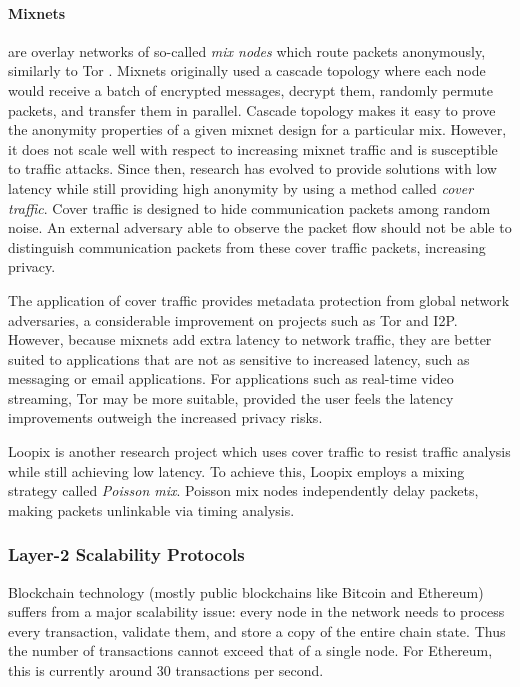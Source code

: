 \paragraph{Mixnets} are overlay networks of so-called \textit{mix nodes} which route packets anonymously, similarly to Tor \cite{mixnets}. Mixnets originally used a cascade topology where each node would receive a batch of encrypted messages, decrypt them, randomly permute packets, and transfer them in parallel. Cascade topology makes it easy to prove the anonymity properties of a given mixnet design for a particular mix. However, it does not scale well with respect to increasing mixnet traffic and is susceptible to traffic attacks. Since then, research has evolved to provide solutions with low latency while still providing high anonymity by using a method called \textit{cover traffic}. Cover traffic is designed to hide communication packets among random noise. An external adversary able to observe the packet flow should not be able to distinguish communication packets from these cover traffic packets, increasing privacy.

The application of cover traffic provides metadata protection from global network adversaries, a considerable improvement on projects such as Tor and I2P. However, because mixnets add extra latency to network traffic, they are better suited to applications that are not as sensitive to increased latency, such as messaging or email applications. For applications such as real-time video streaming, Tor may be more suitable, provided the user feels the latency improvements outweigh the increased privacy risks.

Loopix \cite{loopix} is another research project which uses cover traffic to resist traffic analysis while still achieving low latency. To achieve this, Loopix employs a mixing strategy called \textit{Poisson mix}. Poisson mix nodes independently delay packets, making packets unlinkable via timing analysis.

\subsubsection{Layer-2 Scalability Protocols}
\label{sec:l2protocols}

Blockchain technology (mostly public blockchains like Bitcoin and Ethereum) suffers from a major scalability issue: every node in the network needs to process every transaction, validate them, and store a copy of the entire chain state. Thus the number of transactions cannot exceed that of a single node. For Ethereum, this is currently around 30 transactions per second.

